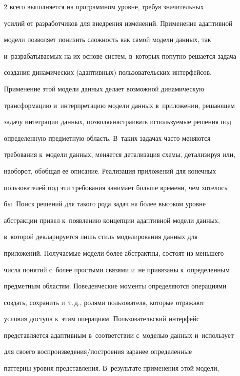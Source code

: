 \begin{multicols}{2}
всего выполняется на программном уровне, требуя значительных 

усилий от разработчиков для внедрения изменений. Применение адаптивной 

модели позволяет понизить сложность как самой модели данных, так 

и~разрабатываемых на их основе систем, в~которых попутно решается задача 

создания динамических (адаптивных) пользовательских интерфейсов. 

    

    Применение этой модели данных делает воз\-мож\-ной динамическую 

трансформацию и~ин\-терпретацию модели данных в~приложении, ре\-ша\-ющем 

задачу интеграции данных, позволяя\linebreak настраивать используемые решения под 

определенную предметную область. В~таких задачах часто меняются 

требования к~модели данных, меняется детализация схемы, детализируя или, 

наоборот, обобщая ее описание. Реализация приложений для конечных 

пользователей под эти требования занимает больше времени, чем хотелось 

бы. Поиск решений для такого рода задач на более высоком уровне 

абстракции привел к~появлению концепции адап\-тив\-ной модели данных, 

в~которой декларируется лишь стиль моделирования данных для 

приложений. Получаемые модели более абстрактны, состоят из меньшего 

числа понятий с~более простыми связями и~не привязаны к~определенным 

предметным областям. Поведенческие моменты определяются операциями 

создать, сохранить и~т.\,д., ролями пользователя, которые отражают 

условия доступа к~этим операциям. Пользовательский интерфейс 

представляется адаптивным в~соответствии с~мо\-делью данных и~использует 

для своего вос\-про\-из\-ве\-де\-ния/по\-стро\-ения заранее определенные 

паттерны уровня представления. В~результате применения этой модели, 


\end{multicols}
